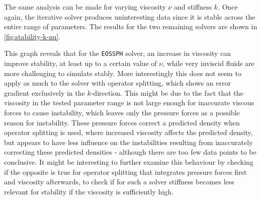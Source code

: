 \horizontalspacer

The same analysis can be made for varying viscosity $\nu$ and stiffness $k$. Once again, the iterative solver produces uninteresting data since it is stable across the entire range of parameters. The results for the two remaining solvers are shown in \autoref{fig:stability-k-nu}.



This graph reveals that for the \texttt{EOSSPH} solver, an increase in viscosity can improve stability, at least up to a certain value of $\nu$, while very inviscid fluids are more challenging to simulate stably. More interestingly this does not seem to apply as much to the solver with operator splitting, which shows an error gradient exclusively in the $k$-direction. This might be due to the fact that the viscosity in the tested parameter range is not large enough for inaccurate viscous forces to cause instability, which leaves only the pressure forces as a possible reason for instability. These pressure forces correct a predicted density when operator splitting is used, where increased viscosity affects the predicted density, but appears to have less influence on the instabilities resulting from inaccurately correcting these predicted densities - although there are too few data points to be conclusive. It might be interesting to further examine this behaviour by checking if the opposite is true for operator splitting that integrates pressure forces first and viscosity afterwards, to check if for such a solver stiffness becomes less relevant for stability if the viscosity is sufficiently high.